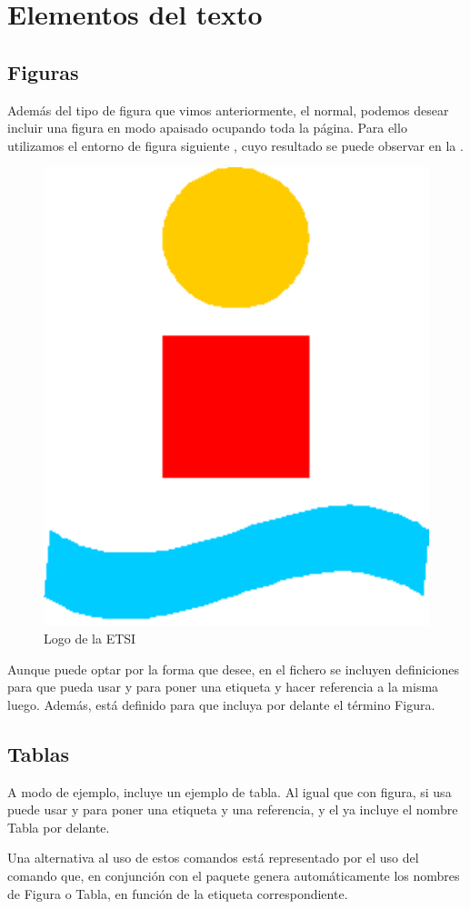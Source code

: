 \section{Elementos del texto}
%

\subsection{Figuras}

Además del tipo de figura que vimos anteriormente, el normal, podemos desear incluir una figura en modo apaisado ocupando toda la página. Para ello utilizamos el entorno de figura siguiente , cuyo resultado se puede observar en la . 

\begin{figure}
\centering
\includegraphics[width=3 cm]{capituloLibroETSI/figuras/logoESI.pdf}
\caption{Logo de la ETSI}
\end{figure}

Aunque puede optar por la forma que desee, en el fichero  se incluyen definiciones para que pueda usar  y  para poner una etiqueta y hacer referencia a la misma luego. Además, está definido para que  incluya por delante el término Figura.

\subsection{Tablas}
A modo de ejemplo,  incluye un ejemplo de tabla. Al igual que con figura, si usa  puede usar  y  para poner una etiqueta y una referencia, y el  ya incluye el nombre Tabla por delante.

Una alternativa al uso de estos comandos está representado por el uso del comando  que, en conjunción con el paquete  genera automáticamente los nombres de Figura o Tabla, en función de la etiqueta correspondiente.

